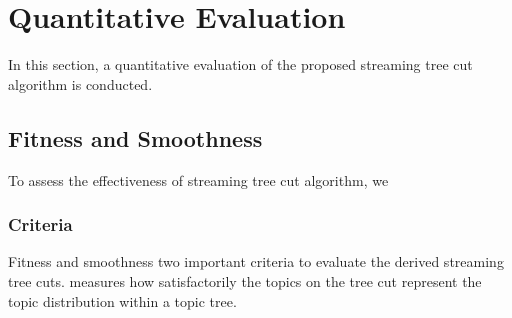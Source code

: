 %

\section{Quantitative Evaluation}
\label{sec:quantitativeevaluation}
In this section, a quantitative evaluation of the proposed streaming tree cut algorithm is conducted.


\subsection{Fitness and Smoothness}
To assess the effectiveness of  streaming tree cut algorithm, we 

\subsubsection{Criteria}
Fitness and smoothness  two important criteria to evaluate the derived streaming tree cuts.
 measures how satisfactorily the topics on the tree cut represent the topic distribution within a topic tree.

